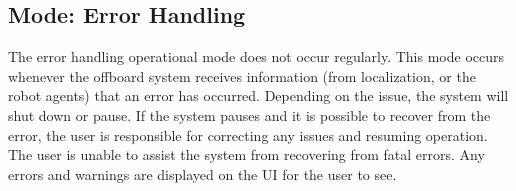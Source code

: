 \subsection{Mode: Error Handling}
\label{sec:operational_error}
The error handling operational mode does not occur regularly. This mode occurs whenever the offboard system receives information (from localization, or the robot agents) that an error has occurred. Depending on the issue, the system will shut down or pause. If the system pauses and it is possible to recover from the error, the user is responsible for correcting any issues and resuming operation. The user is unable to assist the system from recovering from fatal errors. Any errors and warnings are displayed on the UI for the user to see.
